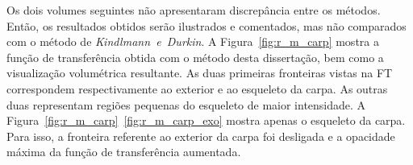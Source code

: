 %	
%	

\newpage
	Os dois volumes seguintes não apresentaram discrepância entre os métodos. Então, os resultados obtidos serão ilustrados e comentados, mas não comparados com o método de \textit{Kindlmann~e~Durkin}.
\clearpage
	A Figura~\ref{fig:r_m_carp} mostra a função de transferência obtida com o método desta dissertação, bem como a visualização volumétrica resultante. As duas primeiras fronteiras vistas na FT correspondem respectivamente ao exterior e ao esqueleto da carpa. As outras duas representam regiões pequenas do esqueleto de maior intensidade. A Figura~\ref{fig:r_m_carp}~\ref{fig:r_m_carp_exo} mostra apenas o esqueleto da carpa. Para isso, a fronteira referente ao exterior da carpa foi desligada e a opacidade máxima da função de transferência aumentada.
	

